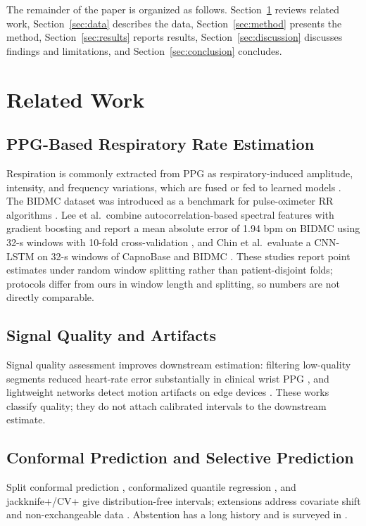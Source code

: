 \documentclass[conference]{IEEEtran}
\begin{document}
The remainder of the paper is organized as follows. Section~\ref{sec:related} reviews related work, Section~\ref{sec:data} describes the data, Section~\ref{sec:method} presents the method, Section~\ref{sec:results} reports results, Section~\ref{sec:discussion} discusses findings and limitations, and Section~\ref{sec:conclusion} concludes.

\section{Related Work}\label{sec:related}
\subsection{PPG-Based Respiratory Rate Estimation}
Respiration is commonly extracted from PPG as respiratory-induced amplitude, intensity, and frequency variations, which are fused or fed to learned models \cite{karlen2013,charlton2018review}. The BIDMC dataset was introduced as a benchmark for pulse-oximeter RR algorithms \cite{pimentel2016}. Lee et al.\ combine autocorrelation-based spectral features with gradient boosting and report a mean absolute error of 1.94 bpm on BIDMC using 32-s windows with 10-fold cross-validation \cite{lee2022rr}, and Chin et al.\ evaluate a CNN-LSTM on 32-s windows of CapnoBase and BIDMC \cite{chin2024rr}. These studies report point estimates under random window splitting rather than patient-disjoint folds; protocols differ from ours in window length and splitting, so numbers are not directly comparable.

\subsection{Signal Quality and Artifacts}
Signal quality assessment improves downstream estimation: filtering low-quality segments reduced heart-rate error substantially in clinical wrist PPG \cite{zhao2026sqi}, and lightweight networks detect motion artifacts on edge devices \cite{zheng2024tinyppg}. These works classify quality; they do not attach calibrated intervals to the downstream estimate.

\subsection{Conformal Prediction and Selective Prediction}
Split conformal prediction \cite{vovk2005,lei2018distfree}, conformalized quantile regression \cite{romano2019cqr}, and jackknife+/CV+ \cite{barber2021jackknife} give distribution-free intervals; extensions address covariate shift and non-exchangeable data \cite{tibshirani2019covshift,barber2023beyond}. Abstention has a long history \cite{chow1970reject,geifman2017selective} and is surveyed in \cite{hendrickx2024reject}.
\end{document}
